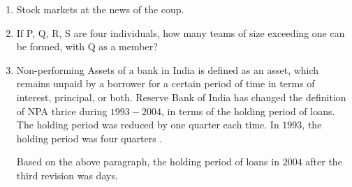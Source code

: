 \documentclass[journal,12pt,onecolumn]{IEEEtran}
\theoremstyle{remark}
\begin{document}
\begin{enumerate}[start=1, label=Q.\arabic*]
\hfill{}

\item Stock markets \underline{\hspace{2cm}} at the news of the coup.
    \begin{enumerate}
    \end{enumerate}

\hfill{}

\item If P, Q, R, S are four individuals, how many teams of size exceeding one can be formed, with Q as a member?
    \begin{enumerate}
    \end{enumerate}

\hfill{}

\item Non-performing Assets  of a bank in India is defined as an asset, which remains unpaid by a borrower for a certain period of time in terms of interest, principal, or both. Reserve Bank of India  has changed the definition of NPA thrice during $1993-2004$, in terms of the holding period of loans. The holding period was reduced by one quarter each time. In $1993$, the holding period was four quarters .
\par Based on the above paragraph, the holding period of loans in $2004$ after the third revision was \underline{\hspace{2cm}} days.
    \begin{enumerate}
    \end{enumerate}


\end{enumerate}
\end{document}
